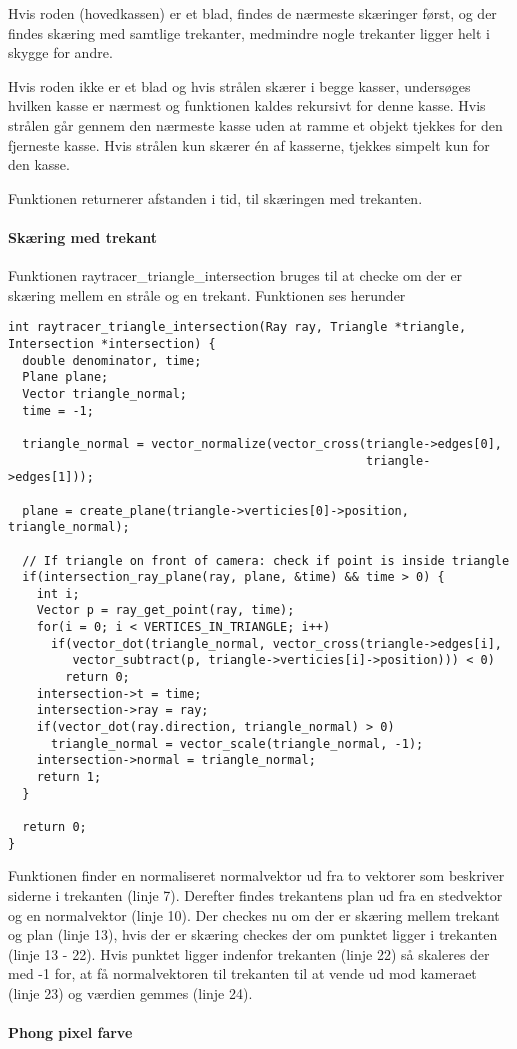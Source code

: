 Hvis roden (hovedkassen) er et blad, findes de nærmeste skæringer først, og der findes skæring med samtlige trekanter, medmindre nogle trekanter ligger helt i skygge for andre.

Hvis roden ikke er et blad og hvis strålen skærer i begge kasser, undersøges hvilken kasse er nærmest og funktionen kaldes rekursivt for denne kasse. Hvis strålen går gennem den nærmeste kasse uden at ramme et objekt tjekkes for den fjerneste kasse. Hvis strålen kun skærer én af kasserne, tjekkes simpelt kun for den kasse.

Funktionen returnerer afstanden i tid, til skæringen med trekanten.

\paragraph{Skæring med trekant}

Funktionen raytracer\_triangle\_intersection bruges til at checke om der er skæring mellem en stråle og en trekant. Funktionen ses herunder

\begin{lstlisting}[style=Cstyle, caption=Funktionen der finder skæring med trekant]
int raytracer_triangle_intersection(Ray ray, Triangle *triangle, Intersection *intersection) {
  double denominator, time;
  Plane plane;
  Vector triangle_normal;
  time = -1;

  triangle_normal = vector_normalize(vector_cross(triangle->edges[0], 
                                                  triangle->edges[1]));

  plane = create_plane(triangle->verticies[0]->position, triangle_normal);

  // If triangle on front of camera: check if point is inside triangle
  if(intersection_ray_plane(ray, plane, &time) && time > 0) {
    int i;
    Vector p = ray_get_point(ray, time);
    for(i = 0; i < VERTICES_IN_TRIANGLE; i++)
      if(vector_dot(triangle_normal, vector_cross(triangle->edges[i], 
         vector_subtract(p, triangle->verticies[i]->position))) < 0)
        return 0;
    intersection->t = time;
    intersection->ray = ray;
    if(vector_dot(ray.direction, triangle_normal) > 0)
      triangle_normal = vector_scale(triangle_normal, -1);
    intersection->normal = triangle_normal;
    return 1;
  }

  return 0;
}
\end{lstlisting}

Funktionen finder en normaliseret normalvektor ud fra to vektorer som beskriver siderne i trekanten (linje 7). Derefter findes trekantens plan ud fra en stedvektor og en normalvektor (linje 10). Der checkes nu om der er skæring mellem trekant og plan (linje 13), hvis der er skæring checkes der om punktet ligger i trekanten (linje 13 - 22). Hvis punktet ligger indenfor trekanten (linje 22) så skaleres der med -1 for, at få normalvektoren til trekanten til at vende ud mod kameraet (linje 23) og værdien gemmes (linje 24).

\paragraph{Phong pixel farve}



